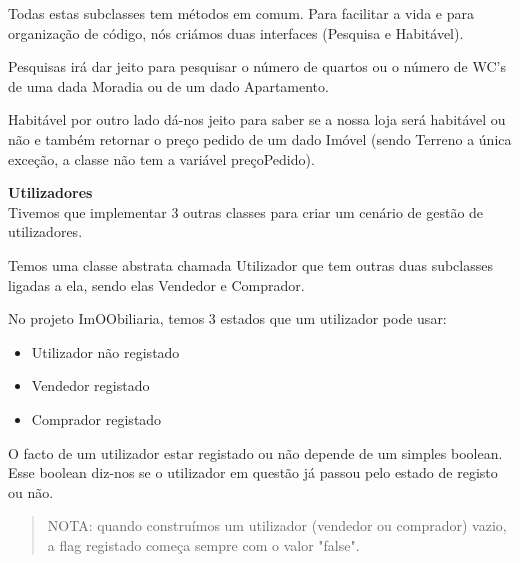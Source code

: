 \documentclass[12pt]{article}
\begin{document}
Todas estas subclasses tem métodos em comum. Para facilitar a vida e para organização de código, nós criámos duas interfaces (Pesquisa e Habitável).
\newline
\newline

Pesquisas irá dar jeito para pesquisar o número de quartos ou o número de WC's de uma dada Moradia ou de um dado Apartamento.
\newline

Habitável por outro lado dá-nos jeito para saber se a nossa loja será habitável ou não e também retornar o preço pedido de um dado Imóvel (sendo Terreno a única exceção, a classe não tem a variável preçoPedido).    

\pagebreak

\textbf{Utilizadores}
~\\

Tivemos que implementar 3 outras classes para criar um cenário de gestão de utilizadores. 
\newline

Temos uma classe abstrata chamada Utilizador que tem outras duas subclasses ligadas a ela, sendo elas Vendedor e Comprador.
\newline

No projeto ImOObiliaria, temos 3 estados que um utilizador pode usar:
\newline
\begin{itemize}
\item Utilizador não registado
\item Vendedor registado
\item Comprador registado
\end{itemize}

O facto de um utilizador estar registado ou não depende de um simples boolean.\\ 

Esse boolean diz-nos se o utilizador em questão já passou pelo estado de registo ou não.
~\\
\newline
\begin{quote}
NOTA: quando construímos um utilizador (vendedor ou comprador) vazio, a flag registado começa sempre com o valor "false".
\end{quote}
\end{document}

